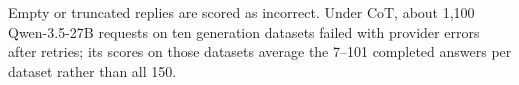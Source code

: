 Empty or truncated replies are scored as incorrect. Under CoT, about 1,100 Qwen-3.5-27B requests on ten generation datasets failed with provider errors after retries; its scores on those datasets average the 7--101 completed answers per dataset rather than all 150.
